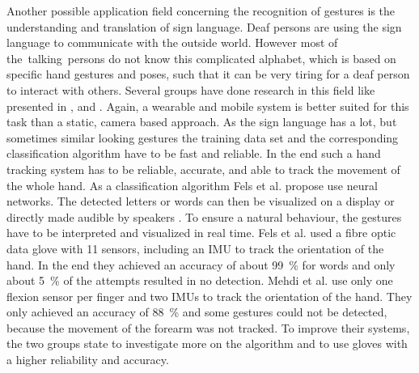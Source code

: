 Another possible application field concerning the recognition of gestures is the understanding and translation of sign language. Deaf persons are using the sign language to communicate with the outside world. However most of the~\grqq talking\grqq~persons do not know this complicated alphabet, which is based on specific hand gestures and poses, such that it can be very tiring for a deaf person to interact with others. Several groups have done research in this field like presented in \cite{mehdi2002sign}, \cite{fels1993glove} and \cite{dipietro2008survey}. Again, a wearable and mobile system is better suited for this task than a static, camera based approach. As the sign language has a lot, but sometimes similar looking gestures the training data set and the corresponding classification algorithm have to be fast and reliable. In the end such a hand tracking system has to be reliable, accurate, and able to track the movement of the whole hand. As a classification algorithm Fels et al. propose use neural networks. The detected letters or words can then be visualized on a display or directly made audible by speakers \cite{fels1993glove}. To ensure a natural behaviour, the gestures have to be interpreted and visualized in real time. Fels et al. used a fibre optic data glove with 11 sensors, including an IMU to track the orientation of the hand. In the end they achieved an accuracy of about \SI{99}{\percent} for words and only about \SI{5}{\percent} of the attempts resulted in no detection. Mehdi et al. use only one flexion sensor per finger and two IMUs to track the orientation of the hand. They only achieved an accuracy of \SI{88}{\percent} and some gestures could not be detected, because the movement of the forearm was not tracked. To improve their systems, the two groups state to investigate more on the algorithm and to use gloves with a higher reliability and accuracy.

